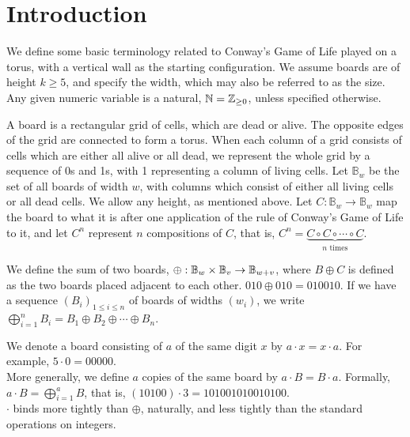 \documentclass[12pt,letterpaper]{article}
\begin{document}
\section{Introduction}
We define some basic terminology related to Conway's Game of Life played on a torus, with a vertical wall as the starting configuration. We assume boards are of height $k\geq 5$, and specify the width, which may also be referred to as the size. Any given numeric variable is a natural, $\mathbb{N}=\mathbb{Z}_{\geq 0}$, unless specified otherwise.
\begin{dfn}
  A board is a rectangular grid of cells, which are dead or alive. The opposite edges of the grid are connected to form a torus. When each column of a grid consists of cells which are either all alive or all dead, we represent the whole grid by a sequence of 0s and 1s, with 1 representing a column of living cells. Let $\mathbb{B}_w$ be the set of all boards of width $w$, with columns which consist of either all living cells or all dead cells. We allow any height, as mentioned above. Let $C:\mathbb{B}_w\rightarrow \mathbb{B}_w$ map the board to what it is after one application of the rule of Conway's Game of Life to it, and let $C^n$ represent $n$ compositions of $C$, that is, $C^n=\underbrace{C\circ C\circ\cdots \circ C}_{n \text{ times}}$. 
\end{dfn}
\begin{dfn}
  We define the sum of two boards, $\oplus:\mathbb{B}_w\times \mathbb{B}_v\rightarrow \mathbb{B}_{w+v}$, where $B\oplus C$ is defined as the two boards placed adjacent to each other. $010\oplus 010 = 010010$. If we have a sequence ${(B_i)}_{1\leq i\leq n}$ of boards of widths $(w_i)$, we write $\displaystyle\bigoplus_{i=1}^{n}B_i = B_1\oplus B_2\oplus\cdots\oplus B_n$. 
\end{dfn}
\begin{dfn}
  We denote a board consisting of $a$ of the same digit $x$ by $a\cdot x = x\cdot a$. For example, $5\cdot 0=00000$. \\
  More generally, we define $a$ copies of the same board by $a\cdot B = B\cdot a$. Formally, $a\cdot B = \displaystyle\bigoplus_{i=1}^{a}B$, that is, $(10100)\cdot 3 = 101001010010100$. \\
  $\cdot$ binds more tightly than $\oplus$, naturally, and less tightly than the standard operations on integers. 
\end{dfn}
\end{document}
